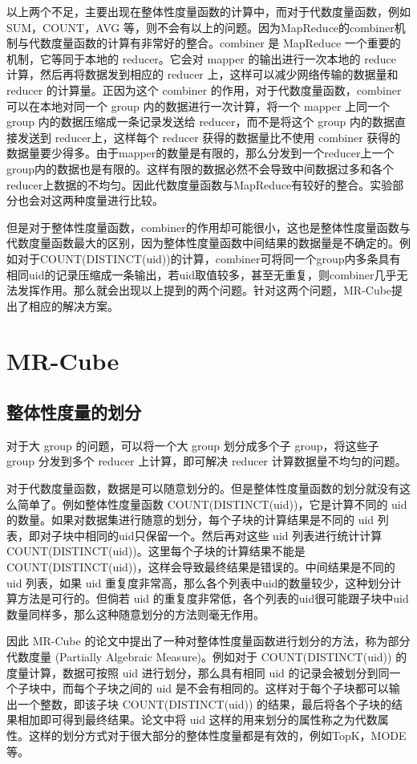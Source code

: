 以上两个不足，主要出现在整体性度量函数的计算中，而对于代数度量函数，例如SUM，COUNT，AVG 等，则不会有以上的问题。因为MapReduce的combiner机制与代数度量函数的计算有非常好的整合。combiner 是 MapReduce 一个重要的机制，它等同于本地的 reducer。它会对 mapper 的输出进行一次本地的 reduce 计算，然后再将数据发到相应的 reducer 上，这样可以减少网络传输的数据量和reducer 的计算量。正因为这个 combiner 的作用，对于代数度量函数，combiner 可以在本地对同一个 group 内的数据进行一次计算，将一个 mapper 上同一个 group 内的数据压缩成一条记录发送给 reducer，而不是将这个 group 内的数据直接发送到 reducer上，这样每个 reducer 获得的数据量比不使用 combiner 获得的数据量要少得多。由于mapper的数量是有限的，那么分发到一个reducer上一个group内的数据也是有限的。这样有限的数据必然不会导致中间数据过多和各个reducer上数据的不均匀。因此代数度量函数与MapReduce有较好的整合。实验部分也会对这两种度量进行比较。

但是对于整体性度量函数，combiner的作用却可能很小，这也是整体性度量函数与代数度量函数最大的区别，因为整体性度量函数中间结果的数据量是不确定的。例如对于COUNT(DISTINCT(uid))的计算，combiner可将同一个group内多条具有相同uid的记录压缩成一条输出，若uid取值较多，甚至无重复，则combiner几乎无法发挥作用。那么就会出现以上提到的两个问题。针对这两个问题，MR-Cube提出了相应的解决方案。

\section{MR-Cube}

\subsection{整体性度量的划分}

对于大 group 的问题，可以将一个大 group 划分成多个子 group，将这些子 group 分发到多个 reducer 上计算，即可解决 reducer 计算数据量不均匀的问题。

对于代数度量函数，数据是可以随意划分的。但是整体性度量函数的划分就没有这么简单了。例如整体性度量函数 COUNT(DISTINCT(uid))，它是计算不同的 uid 的数量。如果对数据集进行随意的划分，每个子块的计算结果是不同的 uid 列表，即对子块中相同的uid只保留一个。然后再对这些 uid 列表进行统计计算 COUNT(DISTINCT(uid))。这里每个子块的计算结果不能是COUNT(DISTINCT(uid))，这样会导致最终结果是错误的。中间结果是不同的 uid 列表，如果 uid 重复度非常高，那么各个列表中uid的数量较少，这种划分计算方法是可行的。但倘若 uid 的重复度非常低，各个列表的uid很可能跟子块中uid数量同样多，那么这种随意划分的方法则毫无作用。 

因此 MR-Cube 的论文中提出了一种对整体性度量函数进行划分的方法，称为部分代数度量 (Partially Algebraic Measure)。例如对于 COUNT(DISTINCT(uid)) 的度量计算，数据可按照 uid 进行划分，那么具有相同 uid 的记录会被划分到同一个子块中，而每个子块之间的 uid 是不会有相同的。这样对于每个子块都可以输出一个整数，即该子块 COUNT(DISTINCT(uid)) 的结果，最后将各个子块的结果相加即可得到最终结果。论文中将 uid 这样的用来划分的属性称之为代数属性。这样的划分方式对于很大部分的整体性度量都是有效的，例如TopK，MODE等。


